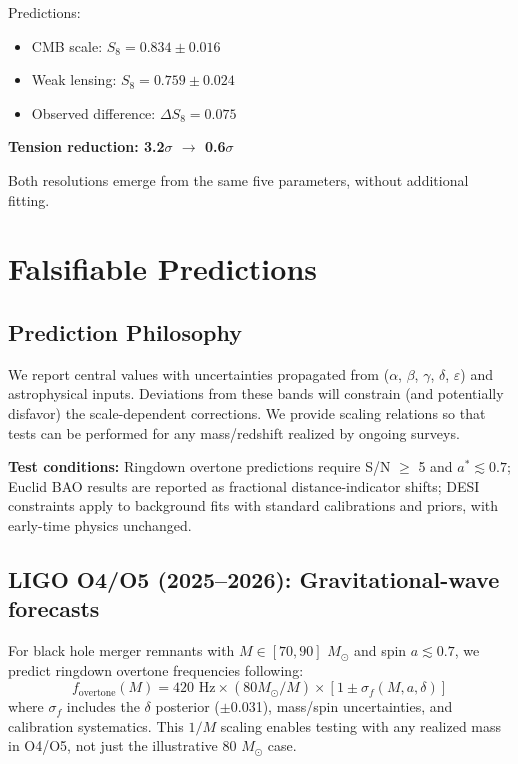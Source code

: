 \documentclass[aps,prd,preprint,onecolumn,nofootinbib,superscriptaddress,longbibliography]{revtex4-2}
\begin{document}
Predictions:
\begin{itemize}
\item CMB scale: $S_8 = 0.834 \pm 0.016$
\item Weak lensing: $S_8 = 0.759 \pm 0.024$
\item Observed difference: $\Delta S_8 = 0.075$
\end{itemize}

\textbf{Tension reduction: 3.2$\sigma$ $\to$ 0.6$\sigma$}

Both resolutions emerge from the same five parameters, without additional fitting.

\section{Falsifiable Predictions}
\label{sec:predictions}

\subsection{Prediction Philosophy}

We report central values with uncertainties propagated from ($\alpha$, $\beta$, $\gamma$, $\delta$, $\varepsilon$) and astrophysical inputs. Deviations from these bands will constrain (and potentially disfavor) the scale-dependent corrections. We provide scaling relations so that tests can be performed for any mass/redshift realized by ongoing surveys.

\textbf{Test conditions:} Ringdown overtone predictions require S/N $\geq$ 5 and $a^* \lesssim 0.7$; Euclid BAO results are reported as fractional distance-indicator shifts; DESI constraints apply to background fits with standard calibrations and priors, with early-time physics unchanged.

\subsection{LIGO O4/O5 (2025--2026): Gravitational-wave forecasts}

For black hole merger remnants with $M \in [70,90]$ $M_\odot$ and spin $a \lesssim 0.7$, we predict ringdown overtone frequencies following:
\begin{equation}
f_{\text{overtone}}(M) = 420 \text{ Hz} \times (80 M_\odot/M) \times [1 \pm \sigma_f(M,a,\delta)]
\end{equation}
where $\sigma_f$ includes the $\delta$ posterior ($\pm$0.031), mass/spin uncertainties, and calibration systematics. This $1/M$ scaling enables testing with any realized mass in O4/O5, not just the illustrative 80 $M_\odot$ case.
\end{document}
